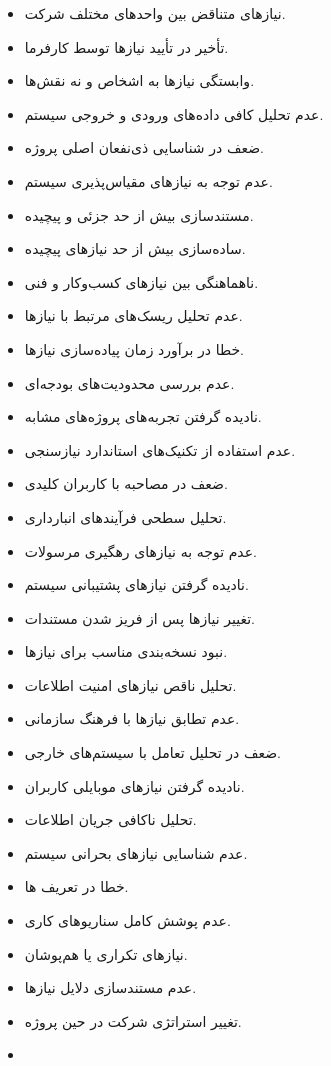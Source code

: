 \documentclass[12pt,a4paper]{report}
\begin{document}
\begin{itemize}
ضعف در تحلیل تعامل کاربران با سیستم.
\item 
نیازهای متناقض بین واحدهای مختلف شرکت.
\item 
تأخیر در تأیید نیازها توسط کارفرما.
\item 
وابستگی نیازها به اشخاص و نه نقش‌ها.
\item 
عدم تحلیل کافی داده‌های ورودی و خروجی سیستم.
\item 
ضعف در شناسایی ذی‌نفعان اصلی پروژه.
\item 
عدم توجه به نیازهای مقیاس‌پذیری سیستم.
\item 
مستندسازی بیش از حد جزئی و پیچیده.
\item 
ساده‌سازی بیش از حد نیازهای پیچیده.
\item 
ناهماهنگی بین نیازهای کسب‌وکار و فنی.
\item 
عدم تحلیل ریسک‌های مرتبط با نیازها.
\item 
خطا در برآورد زمان پیاده‌سازی نیازها.
\item 
عدم بررسی محدودیت‌های بودجه‌ای.
\item 
نادیده گرفتن تجربه‌های پروژه‌های مشابه.
\item 
عدم استفاده از تکنیک‌های استاندارد نیازسنجی.
\item 
ضعف در مصاحبه با کاربران کلیدی.
\item 
تحلیل سطحی فرآیندهای انبارداری.
\item 
عدم توجه به نیازهای رهگیری مرسولات.
\item 
نادیده گرفتن نیازهای پشتیبانی سیستم.
\item 
تغییر نیازها پس از فریز شدن مستندات.
\item 
نبود نسخه‌بندی مناسب برای نیازها.
\item 
تحلیل ناقص نیازهای امنیت اطلاعات.
\item 
عدم تطابق نیازها با فرهنگ سازمانی.
\item 
ضعف در تحلیل تعامل با سیستم‌های خارجی.
\item 
نادیده گرفتن نیازهای موبایلی کاربران.
\item 
تحلیل ناکافی جریان اطلاعات.
\item 
عدم شناسایی نیازهای بحرانی سیستم.
\item 
خطا در تعریف ها.
\item 
عدم پوشش کامل سناریوهای کاری.
\item 
نیازهای تکراری یا هم‌پوشان.
\item 
عدم مستندسازی دلایل نیازها.
\item 
تغییر استراتژی شرکت در حین پروژه.
\item 

\end{itemize}
\end{document}
